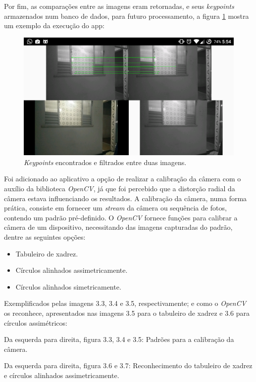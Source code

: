 Por fim, as comparações entre as imagens eram retornadas, e seus \textit{keypoints} armazenados num banco de dados, para futuro processamento, a figura \ref{fig3:2} mostra um exemplo da execução do app:

\begin{figure}
	\centering
		\includegraphics{Imagens/figura3-2E4-4.png}
	\caption{\textit{Keypoints} encontrados e filtrados entre duas imagens.}
	\label{fig3:2}
\end{figure}

 
Foi adicionado ao aplicativo a opção de realizar a calibração da câmera com o auxílio da biblioteca \textit{OpenCV}, já que foi percebido que a distorção radial da câmera estava influenciando os resultados. A calibração da câmera, numa forma prática, consiste em fornecer um \textit{stream} da câmera ou sequência de fotos, contendo um padrão pré-definido. O \textit{OpenCV} fornece funções para calibrar a câmera de um dispositivo, necessitando das imagens capturadas do padrão, dentre as seguintes opções:

\begin{itemize}
	\item{Tabuleiro de xadrez.}
	\item{Círculos alinhados assimetricamente.}
	\item{Círculos alinhados simetricamente.}
\end{itemize}

Exemplificados pelas imagens 3.3, 3.4 e 3.5, respectivamente; e como o \textit{OpenCV} os reconhece, apresentados nas imagens 3.5 para o tabuleiro de xadrez e 3.6 para círculos assimétricos:

Da esquerda para direita, figura 3.3, 3.4 e 3.5: Padrões para a calibração da câmera.


Da esquerda para direita, figura 3.6 e 3.7: Reconhecimento do tabuleiro de xadrez e círculos alinhados assimetricamente.


